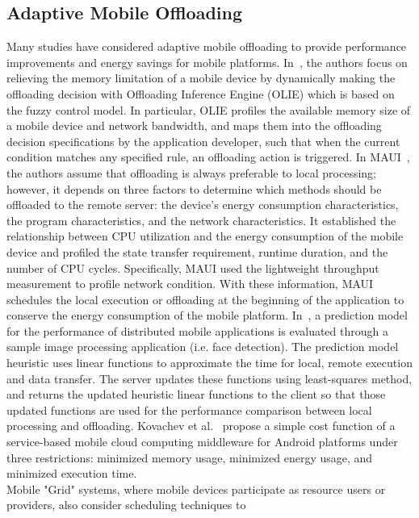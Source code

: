 \subsection{Adaptive Mobile Offloading}
\label{scheduler:adaptive}
%
Many studies have considered adaptive mobile offloading
to provide performance improvements and energy savings for 
mobile platforms.
%
In~\cite{xiaohui}, the authors focus on relieving the memory limitation
of a mobile device by dynamically making the offloading decision with
Offloading Inference Engine (OLIE) which is based on the fuzzy control
model.
%
In particular, OLIE profiles the available memory size of a mobile
device and network bandwidth, and maps them into the offloading decision
specifications by the application developer, such that when the current
condition matches any specified rule, an offloading action is triggered.
%
In MAUI~\cite{maui}, the authors assume that offloading is always
preferable to local processing; however, it depends on three factors to
determine which methods should be offloaded to the remote server: the
device's energy consumption characteristics, the program characteristics,
and the network characteristics.
%
It established the relationship between CPU utilization and the energy
consumption of the mobile device and profiled the state transfer
requirement, runtime duration, and the number of CPU cycles.
%
Specifically, MAUI used the lightweight throughput measurement to profile
network condition.
%
With these information, MAUI schedules the local execution or offloading
at the beginning of the application to conserve the energy consumption
of the mobile platform.
%
In~\cite{shigeru}, a prediction model for the performance of
distributed mobile applications is evaluated through a sample image
processing application (i.e. face detection).
%
The prediction model heuristic uses linear functions to
approximate the time for local, remote execution and data transfer.
%
The server updates these functions using least-squares
method, and returns the updated heuristic linear functions to the client 
so that those updated functions are used for the performance comparison
between local processing and offloading.
%
Kovachev et al.~\cite{dejan} propose a simple cost function of
a service-based mobile cloud computing middleware for Android platforms
under three restrictions: minimized memory usage, minimized energy
usage, and minimized execution time.\\
%
Mobile "Grid" systems, where mobile devices participate as 
resource users or providers, also consider scheduling techniques to 
